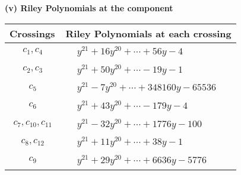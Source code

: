 \documentclass[1p]{elsarticle_modified}
\theoremstyle{definition}
\begin{document}
\flushleft \textbf{(v) Riley Polynomials at the component}\newline \\
\begin{tabular}{m{50pt}|m{274pt}}
Crossings & \hspace{64pt}Riley Polynomials at each crossing \\
\hline $$\begin{aligned}c_{1},c_{4}\end{aligned}$$&$\begin{aligned}
&y^{21}+16 y^{20}+\cdots+56 y-4
\end{aligned}$\\
\hline $$\begin{aligned}c_{2},c_{3}\end{aligned}$$&$\begin{aligned}
&y^{21}+50 y^{20}+\cdots-19 y-1
\end{aligned}$\\
\hline $$\begin{aligned}c_{5}\end{aligned}$$&$\begin{aligned}
&y^{21}-7 y^{20}+\cdots+348160 y-65536
\end{aligned}$\\
\hline $$\begin{aligned}c_{6}\end{aligned}$$&$\begin{aligned}
&y^{21}+43 y^{20}+\cdots-179 y-4
\end{aligned}$\\
\hline $$\begin{aligned}c_{7},c_{10},c_{11}\end{aligned}$$&$\begin{aligned}
&y^{21}-32 y^{20}+\cdots+1776 y-100
\end{aligned}$\\
\hline $$\begin{aligned}c_{8},c_{12}\end{aligned}$$&$\begin{aligned}
&y^{21}+11 y^{20}+\cdots+38 y-1
\end{aligned}$\\
\hline $$\begin{aligned}c_{9}\end{aligned}$$&$\begin{aligned}
&y^{21}+29 y^{20}+\cdots+6636 y-5776
\end{aligned}$\\
\hline
\end{tabular}\\~\\
\end{document}
